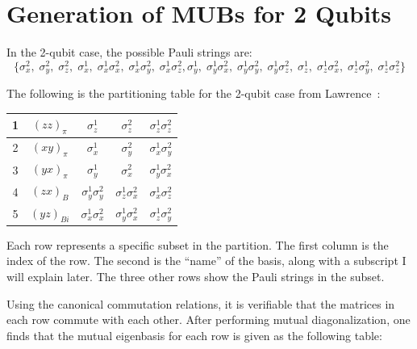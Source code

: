 \documentclass[a4paper,12pt]{article}
\begin{document}
\section{Generation of MUBs for 2 Qubits} \label{app:mub_table}
In the 2-qubit case, the possible Pauli strings are:
\begin{equation}
    \bigl\{  \sigma_x^2,\; \sigma_y^2,\; \sigma_z^2,\;
    \sigma_x^1,\; \sigma_x^1\sigma_x^2,\; \sigma_x^1\sigma_y^2,\; \sigma_x^1\sigma_z^2,
    \sigma_y^1,\; \sigma_y^1\sigma_x^2,\; \sigma_y^1\sigma_y^2,\; \sigma_y^1\sigma_z^2,\; 
    \sigma_z^1,\; \sigma_z^1\sigma_x^2,\; \sigma_z^1\sigma_y^2,\; \sigma_z^1\sigma_z^2 \bigr\}
\end{equation}

The following is the partitioning table for the 2-qubit case from Lawrence~\cite{lawrence_mutually_2002}:


\begin{table}[h]
    \centering
    \begin{tabular}{|c|c|c|c|c|}
        \hline
        1 & $(zz)_\pi$  & $\sigma_z^1$           & $\sigma_z^2$           & $\sigma_z^1\sigma_z^2$ \\ \hline
        2 & $(xy)_\pi$  & $\sigma_x^1$           & $\sigma_y^2$           & $\sigma_x^1\sigma_y^2$ \\ \hline
        3 & $(yx)_\pi$  & $\sigma_y^1$           & $\sigma_x^2$           & $\sigma_y^1\sigma_x^2$ \\ \hline
        4 & $(zx)_B$    & $\sigma_y^1\sigma_y^2$ & $\sigma_z^1\sigma_x^2$ & $\sigma_x^1\sigma_z^2$ \\ \hline
        5 & $(yz)_{Bi}$ & $\sigma_x^1\sigma_x^2$ & $\sigma_y^1\sigma_x^2$ & $\sigma_z^1\sigma_y^2$ \\ \hline
    \end{tabular}
\end{table}

Each row represents a specific subset in the partition.
The first column is the index of the row. The second is the ``name'' of the basis, along with a subscript I will explain later. The three other rows show the Pauli strings in the subset.

Using the canonical commutation relations, it is verifiable that the matrices in each row commute with each other.
After performing mutual diagonalization, one finds that the mutual eigenbasis for each row is given as the following table:
\end{document}
